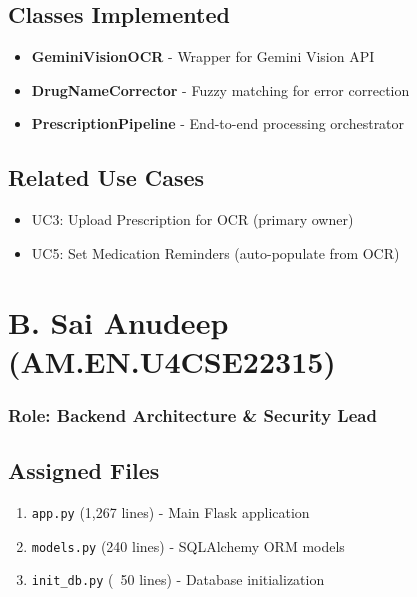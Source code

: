 \documentclass[12pt,a4paper]{report}
\begin{document}
\section{Classes Implemented}
\begin{itemize}
    \item \textbf{GeminiVisionOCR} - Wrapper for Gemini Vision API
    \item \textbf{DrugNameCorrector} - Fuzzy matching for error correction
    \item \textbf{PrescriptionPipeline} - End-to-end processing orchestrator
\end{itemize}

\section{Related Use Cases}
\begin{itemize}
    \item UC3: Upload Prescription for OCR (primary owner)
    \item UC5: Set Medication Reminders (auto-populate from OCR)
\end{itemize}

\newpage

\chapter{B. Sai Anudeep (AM.EN.U4CSE22315)}
\subsection*{Role: Backend Architecture \& Security Lead}

\section{Assigned Files}
\begin{enumerate}
    \item \texttt{app.py} (1,267 lines) - Main Flask application
    \item \texttt{models.py} (240 lines) - SQLAlchemy ORM models
    \item \texttt{init\_db.py} (~50 lines) - Database initialization
\end{enumerate}
\end{document}
